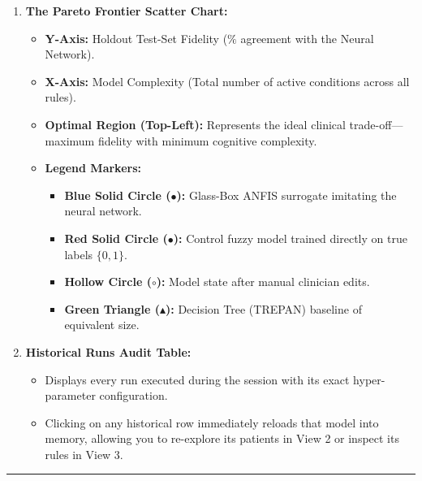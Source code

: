 \documentclass[10pt,a4paper]{article}
\providecommand{\tightlist}{\setlength{\itemsep}{1pt}\setlength{\parskip}{1pt}}
\begin{document}
\begin{enumerate}
\def\labelenumi{\arabic{enumi}.}
\tightlist
\item
  \textbf{The Pareto Frontier Scatter Chart:}

  \begin{itemize}
  \tightlist
  \item
    \textbf{Y-Axis:} Holdout Test-Set Fidelity (\(\%\) agreement with
    the Neural Network).
  \item
    \textbf{X-Axis:} Model Complexity (Total number of active conditions
    across all rules).
  \item
    \textbf{Optimal Region (Top-Left):} Represents the ideal clinical
    trade-off---maximum fidelity with minimum cognitive complexity.
  \item
    \textbf{Legend Markers:}

    \begin{itemize}
    \tightlist
    \item
      \textbf{Blue Solid Circle (\texttt{$\bullet$}):} Glass-Box ANFIS surrogate
      imitating the neural network.
    \item
      \textbf{Red Solid Circle (\texttt{$\bullet$}):} Control fuzzy model
      trained directly on true labels \(\{0, 1\}\).
    \item
      \textbf{Hollow Circle (\texttt{$\circ$}):} Model state after manual
      clinician edits.
    \item
      \textbf{Green Triangle (\texttt{$\blacktriangle$}):} Decision Tree (TREPAN)
      baseline of equivalent size.
    \end{itemize}
  \end{itemize}
\item
  \textbf{Historical Runs Audit Table:}

  \begin{itemize}
  \tightlist
  \item
    Displays every run executed during the session with its exact
    hyper-parameter configuration.
  \item
    Clicking on any historical row immediately reloads that model into
    memory, allowing you to re-explore its patients in View 2 or inspect
    its rules in View 3.
  \end{itemize}
\end{enumerate}

\begin{center}\rule{0.5\linewidth}{0.5pt}\end{center}
\end{document}
